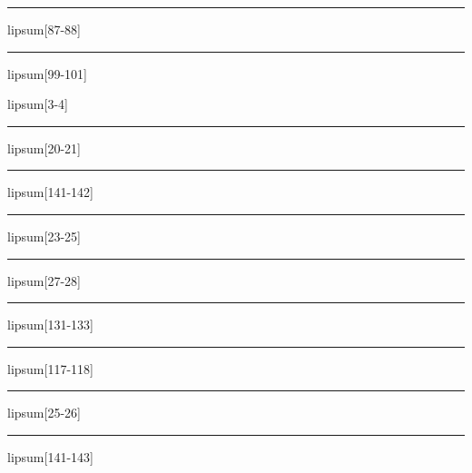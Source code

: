 \documentclass[11pt,a4paper]{article}
\begin{document}
\begin{simplewrap}
  \textcolor{red!55}{\rule{5.6cm}{6.2cm}}
\end{simplewrap}
lipsum[87-88]

\begin{simplewrap}
  \textcolor{orange!37}{\rule{5.0cm}{4.0cm}}
\end{simplewrap}
lipsum[99-101]

lipsum[3-4]

\begin{simplewrap}
  \textcolor{cyan!42}{\rule{5.5cm}{8.8cm}}
\end{simplewrap}
lipsum[20-21]

\begin{simplewrap}
  \textcolor{brown!25}{\rule{4.0cm}{4.2cm}}
\end{simplewrap}
lipsum[141-142]

\begin{simplewrap}
  \textcolor{pink!25}{\rule{3.2cm}{5.6cm}}
\end{simplewrap}
lipsum[23-25]

\begin{simplewrap}
  \textcolor{blue!30}{\rule{3.4cm}{6.0cm}}
\end{simplewrap}
lipsum[27-28]

\begin{simplewrap}
  \textcolor{blue!45}{\rule{4.6cm}{8.6cm}}
\end{simplewrap}
lipsum[131-133]

\begin{simplewrap}
  \textcolor{blue!31}{\rule{4.1cm}{2.4cm}}
\end{simplewrap}
lipsum[117-118]

\begin{simplewrap}
  \textcolor{red!55}{\rule{5.0cm}{7.7cm}}
\end{simplewrap}
lipsum[25-26]

\begin{simplewrap}
  \textcolor{magenta!10}{\rule{4.0cm}{8.6cm}}
\end{simplewrap}
lipsum[141-143]
\end{document}
